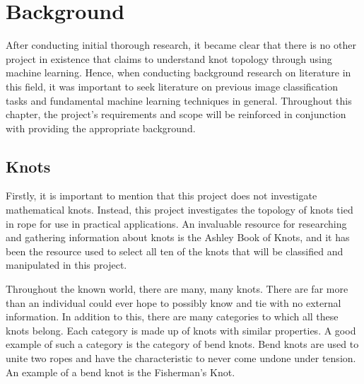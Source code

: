 \documentclass{l4proj}
\begin{document}

%
%



\chapter{Background}

After conducting initial thorough research, it became clear that there is no other project in existence that claims to understand knot topology through using machine learning.
Hence, when conducting background research on literature in this field, it was important to seek literature on previous image classification tasks and fundamental machine learning techniques in general.
Throughout this chapter, the project's requirements and scope will be reinforced in conjunction with providing the appropriate background.

\section{Knots}
Firstly, it is important to mention that this project does not investigate mathematical knots.
Instead, this project investigates the topology of knots tied in rope for use in practical applications.
An invaluable resource for researching and gathering information about knots is the Ashley Book of Knots\cite{ashley1947ashley}, and it has been the resource used to select all ten of the knots that will be classified and manipulated in this project.


Throughout the known world, there are many, many knots. 
There are far more than an individual could ever hope to possibly know and tie with no external information.
In addition to this, there are many categories to which all these knots belong.
Each category is made up of knots with similar properties.
A good example of such a category is the category of bend knots.
Bend knots are used to unite two ropes and have the characteristic to never come undone under tension.
An example of a bend knot is the Fisherman's Knot.
\end{document}
